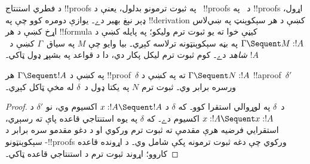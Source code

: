 \documentclass[../../../include/open-logic-section]{subfiles}
\begin{document}


د فطري استنتاج !!{proof}s په ثبوت ترمونو بدلول، يعنې
د ~!!{proof}s د ~په !!{proof}s
اړول، ډېر نېغ بهير دے۔ يوازې دومره کوو چې په
!!{derivation} کښې د هر سېکوېنټ په ښي‌لاس اړخ کښې
د هر !!{formula} کيڼې خوا ته يو ثبوت ترم وليکو؛ په
پايله کښې د $\Gamma \Sequent M : !A$ په بڼه
سېکوېنټونه ترلاسه کېږي۔ بيا وايو چې $M$ په
سياق~$\Gamma$ کښې د~$!A$ \emph{شاهد} دے۔ کوم ثبوت
ترم ليکل پکار دي، دا د  قواعد په بشپړ
ډول ټاکي۔

\begin{prop}
په  کښې د $\Gamma \Sequent !A$ هر
!!{proof}~$\delta$ ته په  کښې د
$\Gamma \Sequent N : !A$ !!a{proof}~$\delta'$
ورسره برابر وي۔ ثبوت ترم $N$ په يکتا ډول د~$\delta$
له مخې ټاکل کېږي۔
\end{prop}

\begin{proof}
د~$\delta$ په لوړوالي استقرا کوو۔ که $\delta$ د
$x:!A \Sequent !A$ اکسيوم وي، نو $\delta'$ د
$x:!A \Sequent x:!A$ اکسيوم دے۔ که $\delta$ په
يوه استنتاجي قاعده پاې ته رسېږي، استقرايي فرضيه
هرې مقدمې ته ثبوت ترم ورکوي او د دغو مقدمو سره
برابر د سېکوېنټونو -!!{proof}s ورکوي چې
دغه ثبوت ترمونه پکې شامل وي۔ د  اړونده
قاعده کاروو؛ اړوند ثبوت ترم د  استنتاجي
قاعده ټاکي۔
\end{proof}
\end{document}
